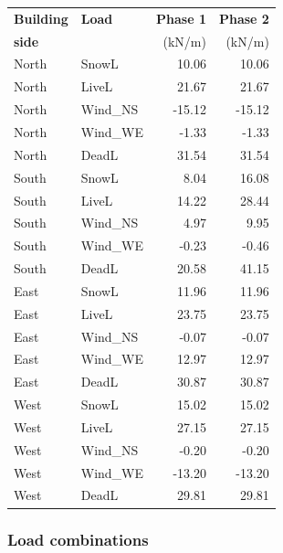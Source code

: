 \begin{center}
  \begin{tabular}{|l|l|r|r|}
\hline
\textbf{Building} & \textbf{Load} & \textbf{Phase 1} & \textbf{Phase 2}\\
\textbf{side} &  & (kN/m) & (kN/m)\\
\hline
North & SnowL & 10.06 & 10.06\\
North & LiveL & 21.67 & 21.67\\
North & Wind\_NS & -15.12 & -15.12\\
North & Wind\_WE & -1.33 & -1.33\\
North & DeadL & 31.54 & 31.54\\
\hline
South & SnowL & 8.04 & 16.08\\
South & LiveL & 14.22 & 28.44\\
South & Wind\_NS & 4.97 & 9.95\\
South & Wind\_WE & -0.23 & -0.46\\
South & DeadL & 20.58 & 41.15\\
\hline
East & SnowL & 11.96 & 11.96\\
East & LiveL & 23.75 & 23.75\\
East & Wind\_NS & -0.07 & -0.07\\
East & Wind\_WE & 12.97 & 12.97\\
East & DeadL & 30.87 & 30.87\\
\hline
West & SnowL & 15.02 & 15.02\\
West & LiveL & 27.15 & 27.15\\
West & Wind\_NS & -0.20 & -0.20\\
West & Wind\_WE & -13.20 & -13.20\\
West & DeadL & 29.81 & 29.81\\
\hline
\end{tabular}
\end{center}

\subsubsection{Load combinations}

